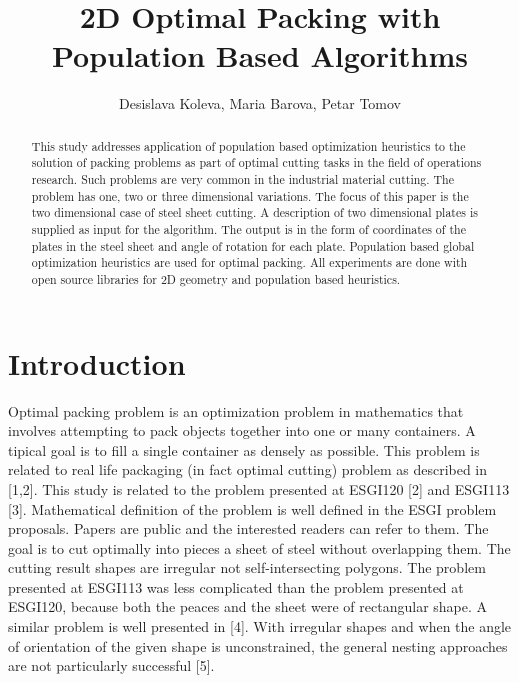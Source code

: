 \documentclass{llncs}
\begin{document}
\pagestyle{headings} 
\mainmatter
%
\title{2D Optimal Packing with Population Based Algorithms}
%
\author{Desislava Koleva, Maria Barova, Petar Tomov}
%
%
%
%
%
\maketitle
%
\begin{abstract}
This study addresses application of population based optimization heuristics to the solution of packing problems as part of optimal cutting tasks in the field of operations research. Such problems are very common in the industrial material cutting. The problem has one, two or three dimensional variations. The focus of this paper is the two dimensional case of steel sheet cutting. A description of two dimensional plates is supplied as input for the algorithm. The output is in the form of coordinates of the plates in the steel sheet and angle of rotation for each plate. Population based global optimization heuristics are used for optimal packing. All experiments are done with open source libraries for 2D geometry and population based heuristics. 
\end{abstract}
%
\section{Introduction}
%
Optimal packing problem is an optimization problem in mathematics that involves attempting to pack objects together into one or many containers. A tipical goal is to fill a single container as densely as possible. This problem is related to real life packaging (in fact optimal cutting) problem as described in [1,2]. This study is related to the problem presented at ESGI120 [2] and ESGI113 [3]. Mathematical definition of the problem is well defined in the ESGI problem proposals. Papers are public and the interested readers can refer to them. The goal is to cut optimally into pieces a sheet of steel without overlapping them. The cutting result shapes are irregular not self-intersecting polygons. The problem presented at ESGI113 was less complicated than the problem presented at ESGI120, because both the peaces and the sheet were of rectangular shape. A similar problem is well presented in [4]. With irregular shapes and when the angle of orientation of the given shape is unconstrained, the general nesting approaches are not particularly successful [5]. 
\end{document}
